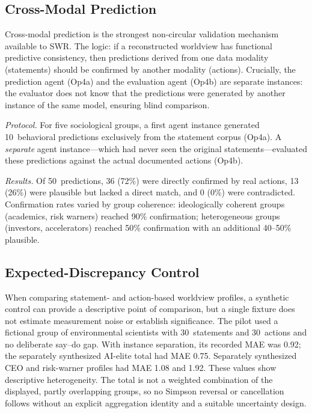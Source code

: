 \documentclass[11pt,a4paper]{article}
\begin{document}
\subsection{Cross-Modal Prediction}
\label{sec:qa:crossmodal}

Cross-modal prediction is the strongest non-circular validation mechanism available to SWR. The logic: if a reconstructed worldview has functional predictive consistency, then predictions derived from one data modality (statements) should be confirmed by another modality (actions). Crucially, the prediction agent (Op4a) and the evaluation agent (Op4b) are separate instances: the evaluator does not know that the predictions were generated by another instance of the same model, ensuring blind comparison.

\emph{Protocol.} For five sociological groups, a first agent instance generated 10~behavioral predictions exclusively from the statement corpus (Op4a). A \emph{separate} agent instance---which had never seen the original statements---evaluated these predictions against the actual documented actions (Op4b).

\emph{Results.} Of 50~predictions, 36 (72\%) were directly confirmed by real actions, 13 (26\%) were plausible but lacked a direct match, and 0 (0\%) were contradicted. Confirmation rates varied by group coherence: ideologically coherent groups (academics, risk warners) reached 90\% confirmation; heterogeneous groups (investors, accelerators) reached 50\% confirmation with an additional 40--50\% plausible.


\subsection{Expected-Discrepancy Control}
\label{sec:qa:discrepancy}

When comparing statement- and action-based worldview profiles, a synthetic control can provide a descriptive point of comparison, but a single fixture does not estimate measurement noise or establish significance. The pilot used a fictional group of environmental scientists with 30~statements and 30~actions and no deliberate say--do gap. With instance separation, its recorded MAE was 0.92; the separately synthesized AI-elite total had MAE 0.75. Separately synthesized CEO and risk-warner profiles had MAE 1.08 and 1.92. These values show descriptive heterogeneity. The total is not a weighted combination of the displayed, partly overlapping groups, so no Simpson reversal or cancellation follows without an explicit aggregation identity and a suitable uncertainty design.
\end{document}
